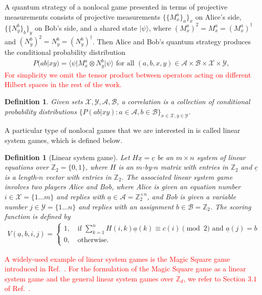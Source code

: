 \documentclass[11pt,letterpaper]{article}
\newcommand{\ket}[1]{|#1\rangle}
\newcommand{\bra}[1]{\langle#1|}
\newcommand{\x}{\otimes}
\newcommand{\Z}{\mathbb{Z}}
\newcommand{\calX}{\mathcal{X}}
\newcommand{\calY}{\mathcal{Y}}
\newcommand{\calA}{\mathcal{A}}
\newcommand{\calB}{\mathcal{B}}
\newcommand{\1}{\mathbb{1}}
\newcommand{\ux}{\underline{x}}
\newcommand{\uc}{\underline{c}}
\newcommand{\ua}{\underline{a}}
\newcommand{\pr}[2]{P(#1|#2)}
\newcommand{\hf}[1]{\textcolor{red}{#1}}
\newtheorem{definition}[theorem]{Definition}
\theoremstyle{definition}
\begin{document}
A quantum strategy of a nonlocal game presented in terms of projective measurements
consists of projective measurements $\{\{M_x^a\}_a\}_x$ on Alice's side, 
$\{\{N_y^b\}_b\}_y$ on Bob's side, and a shared state $\ket{\psi}$, where 
$(M_x^a)^2 = M_x^a = (M_x^a)^\dagger$ and $(N_y^b)^2 = N_y^b = (N_y^b)^\dagger$.
Then Alice and Bob's quantum strategy produces the conditional probability distribution
\begin{align}
	\pr{ab}{xy} = \bra{\psi} M_x^a \x N_y^b \ket{\psi} \text{ for all } (a,b,x,y) \in \calA \times \calB \times \calX \times \calY,
\end{align}
\hf{For simplicity we omit the tensor product between operators acting on different Hilbert spaces in the rest of the work.}

\begin{definition}
	Given sets $\calX, \calY, \calA, \calB$, a correlation is a collection of conditional probability distributions
	$\{\pr{ab}{xy}: a \in \calA, b \in \calB\}_{x \in \calX, y \in \calY}$.
\end{definition}
A particular type of nonlocal games that we are interested in is called linear system games, which is defined below.
\begin{definition}[Linear system game]
 Let $H\ux = \uc$ be an $m \times n$ system of linear equations over $\Z_2 = \{0, 1\}$,
 where $H$ is an $m$-by-$n$ matrix with entries in $\Z_2$ and 
 $\uc$ is a length-$n$ vector with entries in $\Z_2$. 
 The associated linear system game involves two
 players Alice and Bob, where Alice is given an equation number $i \in \calX = \{1 \dots m\}$ and replies with $\ua \in \calA = \Z_2^{\times n}$,
 and Bob is given a variable number $j \in \calY = \{1 \dots n\}$ and replies with an assignment $b \in \calB = \Z_2$. The 
 scoring function is defined by
 \begin{align}
 	V(\ua, b, i, j) =
	\begin{cases}
		1, \quad \text{if } \sum_{k= 1}^n H(i,k) \ua(k) \equiv c(i) \pmod 2 \text{ and } \ua(j) = b \\
		0,  \quad \text{otherwise.}
	\end{cases}
\end{align}
\end{definition}
\hf{A widely-used example of linear system games is the Magic Square game introduced in Ref.~\cite{magic_square}.
For the formulation of the Magic Square game as a linear system game
and the general linear system games over $\Z_d$, we refer to Section $3.1$ of Ref.~\cite{coladan2017}.}
\end{document}
